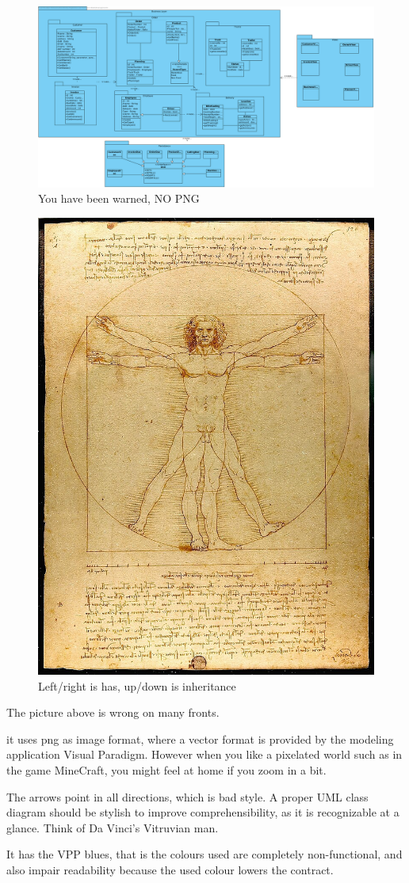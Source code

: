 \begin{figure}[htbp]
  \includegraphics[width=\linewidth]{images/ClassDiagram1.png}
  \caption{You have been warned, NO PNG}
\end{figure}

\begin{figure}
  \includegraphics[width=.4\textwidth]{images/Da_Vinci_Vitruve_Luc_Viatour.jpg}
  \caption{Left/right is has, up/down is inheritance}
\end{figure}
The picture above is wrong on many fronts.
\begin{Itemize}
\item it uses png as image format, where a vector format is provided by the modeling application Visual Paradigm.
  However when you like a pixelated world such as in the game MineCraft, you might feel at home if you zoom in a bit.
\item The arrows point in all directions, which is bad style. A proper UML class diagram should be stylish to improve comprehensibility, as it is recognizable at a glance. Think of Da Vinci's Vitruvian man.
\item It has the VPP blues, that is the colours used are completely non-functional, and also impair readability because the used colour lowers the contract.
\end{Itemize}

